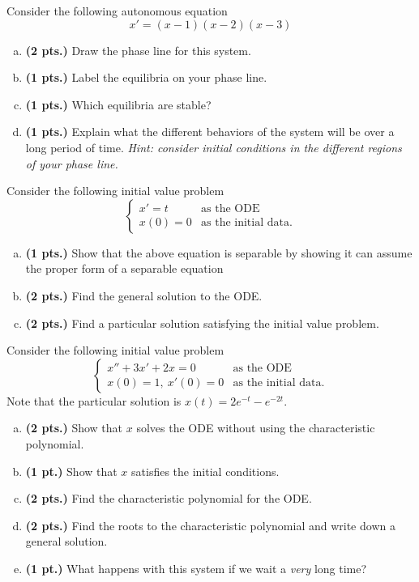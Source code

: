 \documentclass[12pt]{amsbook}
\begin{document}
\begin{problem}
Consider the following autonomous equation
\[
x' = (x-1)(x-2)(x-3)
\]
\begin{enumerate}[(a)]
    \item \textbf{(2 pts.)} Draw the phase line for this system.
    \item \textbf{(1 pts.)} Label the equilibria on your phase line.
    \item \textbf{(1 pts.)} Which equilibria are stable?
    \item \textbf{(1 pts.)} Explain what the different behaviors of the system will be over a long period of time. \emph{Hint: consider initial conditions in the different regions of your phase line.}
\end{enumerate}
\end{problem}

\begin{problem}
Consider the following initial value problem
\[
\begin{cases}
x' = t  & \textrm{as the ODE}\\
x(0) = 0 & \textrm{as the initial data}.
\end{cases}
\]
\begin{enumerate}[(a)]
    \item \textbf{(1 pts.)} Show that the above equation is separable by showing it can assume the proper form of a separable equation
	\item \textbf{(2 pts.)} Find the general solution to the ODE.
	\item \textbf{(2 pts.)} Find a particular solution satisfying the initial value problem.
\end{enumerate}
\end{problem}

\newpage
\begin{problem}
Consider the following initial value problem
\[
\begin{cases}
	x''+3x'+2x = 0 & \textrm{as the ODE}\\
	x(0)=1,~x'(0)=0 &\textrm{as the initial data}.
	\end{cases}
\]
Note that the particular solution is $x(t)=2 e^{-t}-e^{-2t}$.
\begin{enumerate}[(a)]
	\item \textbf{(2 pts.)} Show that $x$ solves the ODE without using the characteristic polynomial.
	\item \textbf{(1 pt.)} Show that $x$ satisfies the initial conditions.
	\item \textbf{(2 pts.)} Find the characteristic polynomial for the ODE.
	\item \textbf{(2 pts.)} Find the roots to the characteristic polynomial and write down a general solution.
	\item \textbf{(1 pt.)} What happens with this system if we wait a \emph{very} long time?
\end{enumerate}
\end{problem}
\end{document}
